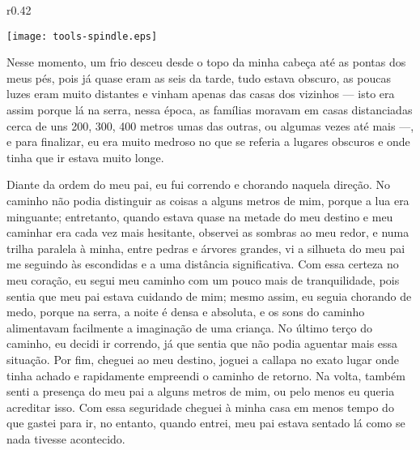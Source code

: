 \ifdefined\EnableIncludeImages
\begin{wrapfigure}{r}{0.42\textwidth}
  \begin{center}
  \vspace{-10pt}
    \texttt{[image: tools-spindle.eps]}
  \end{center}
  \vspace{-20pt}
\end{wrapfigure}
\fi
Nesse momento, um frio desceu desde o topo da minha cabeça até as pontas dos meus pés, pois já quase eram as seis da tarde, tudo estava obscuro, as poucas luzes eram muito distantes e vinham apenas das casas dos vizinhos --- isto era assim porque lá na serra, nessa época, as famílias moravam em casas distanciadas cerca de uns 200, 300, 400 metros umas das outras, ou algumas vezes até mais ---, e para finalizar, eu era muito medroso no que se referia a lugares obscuros e onde tinha que ir estava muito longe.

Diante da ordem do meu pai, eu fui correndo e chorando naquela direção. No caminho não podia distinguir as coisas a alguns metros de mim, porque a lua era minguante; entretanto, quando estava quase na metade do meu destino e meu caminhar era cada vez mais hesitante, observei as sombras ao meu redor, e numa trilha paralela à minha, entre pedras e árvores grandes, vi a silhueta do meu pai me seguindo às escondidas e a uma distância significativa.
Com essa certeza no meu coração, eu segui meu caminho com um pouco mais de tranquilidade, pois sentia que meu pai estava cuidando de mim; mesmo assim, eu seguia chorando de medo, porque na serra, a noite é densa e absoluta, e os sons do caminho alimentavam facilmente a imaginação de uma criança.
No último terço do caminho, eu decidi ir correndo, já que sentia que não podia aguentar mais essa situação. Por fim, cheguei ao meu destino, joguei a callapa no exato lugar onde tinha achado e rapidamente empreendi o caminho de retorno.
Na volta, também senti a presença do meu pai a alguns metros de mim, ou pelo menos eu queria acreditar isso. Com essa seguridade cheguei à minha casa em menos tempo do que gastei para ir, no entanto, quando entrei, meu pai estava sentado lá como se nada tivesse acontecido.


